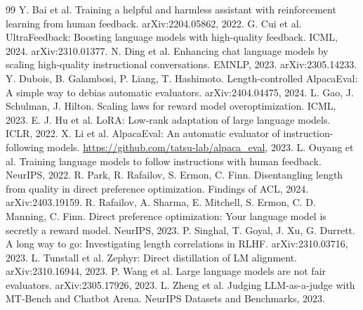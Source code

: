 \documentclass[10pt]{article}
\begin{document}
\begin{thebibliography}{99}
\setlength{\itemsep}{1pt}
\small
{} Y. Bai et al. Training a helpful and harmless assistant with reinforcement learning from human
feedback. arXiv:2204.05862, 2022.
 G. Cui et al. UltraFeedback: Boosting language models with high-quality feedback. ICML, 2024.
arXiv:2310.01377.
 N. Ding et al. Enhancing chat language models by scaling high-quality instructional
conversations. EMNLP, 2023. arXiv:2305.14233.
 Y. Dubois, B. Galambosi, P. Liang, T. Hashimoto. Length-controlled AlpacaEval: A simple way to
debias automatic evaluators. arXiv:2404.04475, 2024.
 L. Gao, J. Schulman, J. Hilton. Scaling laws for reward model overoptimization. ICML, 2023.
 E. J. Hu et al. LoRA: Low-rank adaptation of large language models. ICLR, 2022.
 X. Li et al. AlpacaEval: An automatic evaluator of instruction-following models.
\url{https://github.com/tatsu-lab/alpaca_eval}, 2023.
 L. Ouyang et al. Training language models to follow instructions with human feedback. NeurIPS,
2022.
 R. Park, R. Rafailov, S. Ermon, C. Finn. Disentangling length from quality in direct preference
optimization. Findings of ACL, 2024. arXiv:2403.19159.
 R. Rafailov, A. Sharma, E. Mitchell, S. Ermon, C. D. Manning, C. Finn. Direct preference
optimization: Your language model is secretly a reward model. NeurIPS, 2023.
 P. Singhal, T. Goyal, J. Xu, G. Durrett. A long way to go: Investigating length correlations
in RLHF. arXiv:2310.03716, 2023.
 L. Tunstall et al. Zephyr: Direct distillation of LM alignment. arXiv:2310.16944, 2023.
 P. Wang et al. Large language models are not fair evaluators. arXiv:2305.17926, 2023.
 L. Zheng et al. Judging LLM-as-a-judge with MT-Bench and Chatbot Arena. NeurIPS Datasets and
Benchmarks, 2023.
\end{thebibliography}
\end{document}
